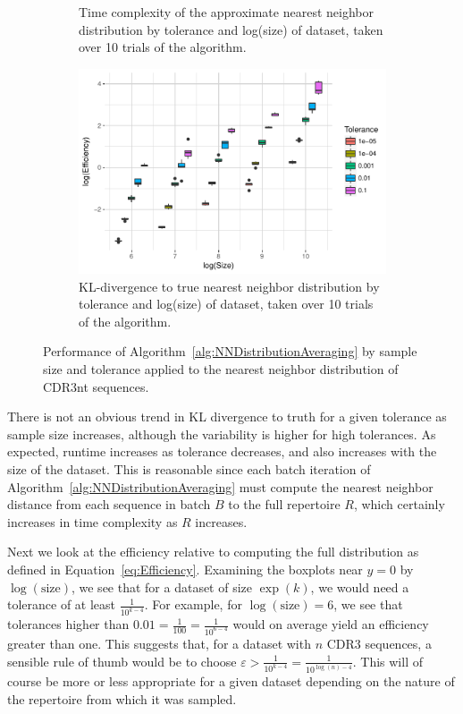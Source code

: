 \documentclass{article}
\begin{document}
\begin{figure}
\begin{subfigure}{0.49\textwidth}
    	\caption{Time complexity of the approximate nearest neighbor distribution by tolerance and log(size) of dataset, taken over 10 trials of the algorithm.}
    	\label{fig:NNTimeBySizeCDR3}
    \end{subfigure}
    \begin{subfigure}{0.5\textwidth}
        \includegraphics[width=\linewidth]{Figures/NearestNeighbor/CDR3/efficiency_by_size_and_tol.pdf}
    	\caption{KL-divergence to true nearest neighbor distribution by tolerance and log(size) of dataset, taken over 10 trials of the algorithm.}
    	\label{fig:NNEfficiencyBySizeCDR3}
    \end{subfigure}
    \caption{Performance of Algorithm~\ref{alg:NNDistributionAveraging} by sample size and tolerance applied to the nearest neighbor distribution of CDR3nt sequences.}
\end{figure}
There is not an obvious trend in KL divergence to truth for a given tolerance as sample size increases, although the variability is higher for high tolerances.
As expected, runtime increases as tolerance decreases, and also increases with the size of the dataset.
This is reasonable since each batch iteration of Algorithm~\ref{alg:NNDistributionAveraging} must compute the nearest neighbor distance from each sequence in batch $B$ to the full repertoire $R$, which certainly increases in time complexity as $R$ increases.

Next we look at the efficiency relative to computing the full distribution as defined in Equation~\ref{eq:Efficiency}.
Examining the boxplots near $y = 0$ by $\log(\text{size})$, we see that for a dataset of size $\exp(k)$, we would need a tolerance of at least $\frac{1}{10^{k - 4}}$.
For example, for $\log(\text{size}) = 6$, we see that tolerances higher than $0.01 = \frac{1}{100} = \frac{1}{10^{6 - 4}}$ would on average yield an efficiency greater than one.
This suggests that, for a dataset with $n$ CDR3 sequences, a sensible rule of thumb would be to choose $\varepsilon > \frac{1}{10^{k - 4}} = \frac{1}{10^{\log(n) - 4}}$.
This will of course be more or less appropriate for a given dataset depending on the nature of the repertoire from which it was sampled.
\end{document}
